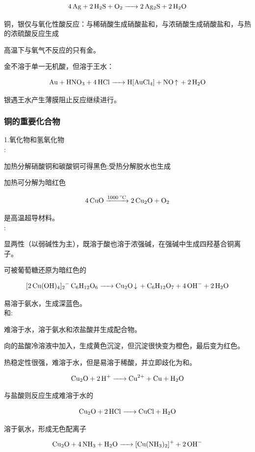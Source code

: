 \documentclass[a4paper,UTF8]{article}
\begin{document}
$$ \ce{4Ag + 2H2S + O2 -> 2Ag2S + 2H2O} $$

铜，银仅与氧化性酸反应：与稀硝酸生成硝酸盐和，与浓硝酸生成硝酸盐和，与热的浓硫酸反应生成

高温下与氧气不反应的只有金。

金不溶于单一无机酸，但溶于王水：

$$ \ce{Au + HNO3 + 4HCl ->H[AuCl4] + NO ^ + 2H2O} $$

银遇王水产生薄膜阻止反应继续进行。

\subsubsection{铜的重要化合物}
1.氧化物和氢氧化物\\

:

加热分解硝酸铜和碳酸铜可得黑色;受热分解脱水也生成

加热可分解为暗红色

$$ \ce{4CuO ->[1000^\circ C] 2Cu2O + O2} $$

是高温超导材料。\\

:

显两性（以弱碱性为主），既溶于酸也溶于浓强碱，在强碱中生成四羟基合铜离子。

可被葡萄糖还原为暗红色的

$$ \ce{[2Cu(OH)4]2- C6H12O6 -> Cu2O v + C6H12O7 + 4OH- + 2H2O} $$

易溶于氨水，生成深蓝色。\\

和:

难溶于水，溶于氨水和浓盐酸并生成配合物。

向的盐酸冷溶液中加入，生成黄色沉淀，但沉淀很快变为橙色，最后变为红色。

热稳定性很强，难溶于水，但是易溶于稀酸，并立即歧化为和。

$$ \ce{Cu2O + 2H+ -> Cu^{2+} + Cu + H2O} $$

与盐酸则反应生成难溶于水的

$$ \ce{Cu2O + 2HCl -> CuCl + H2O} $$

溶于氨水，形成无色配离子\ce{[Cu(NH3)2]^{+}}

$$ \ce{Cu2O + 4NH3 + H2O -> [Cu(NH3)2]^{+} + 2OH-} $$
\end{document}
